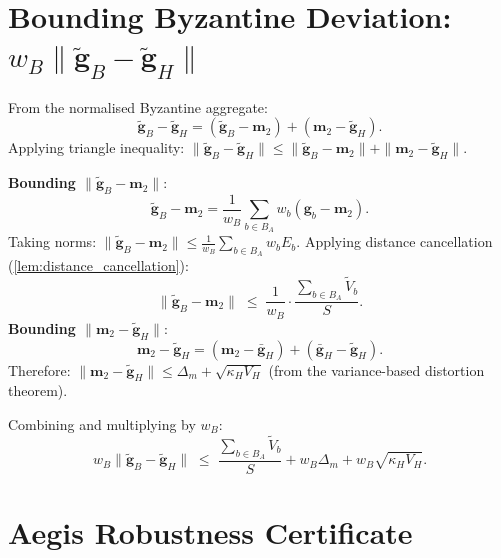 \documentclass[../main]{subfiles}
\begin{document}
\section{Bounding Byzantine Deviation: \texorpdfstring{$w_B\|\widetilde{\mathbf{g}}_B - \widetilde{\mathbf{g}}_H\|$}{w\_B ||g\_B - g\_H||}}
\label{app:byz_deviation_full}

From the normalised Byzantine aggregate:
\[
    \widetilde{\mathbf{g}}_B - \widetilde{\mathbf{g}}_H = (\widetilde{\mathbf{g}}_B - \mathbf{m}_2) + (\mathbf{m}_2 - \widetilde{\mathbf{g}}_H).
\]
Applying triangle inequality:
$\|\widetilde{\mathbf{g}}_B - \widetilde{\mathbf{g}}_H\| \leq \|\widetilde{\mathbf{g}}_B - \mathbf{m}_2\| + \|\mathbf{m}_2 - \widetilde{\mathbf{g}}_H\|$.

\textbf{Bounding $\|\widetilde{\mathbf{g}}_B - \mathbf{m}_2\|$}:
\[
    \widetilde{\mathbf{g}}_B - \mathbf{m}_2 = \frac{1}{w_B}\sum_{b \in B_A} w_b(\mathbf{g}_b - \mathbf{m}_2).
\]
Taking norms:
$\|\widetilde{\mathbf{g}}_B - \mathbf{m}_2\| \leq \frac{1}{w_B}\sum_{b \in B_A} w_b E_b$.
Applying distance cancellation (\cref{lem:distance_cancellation}):
\begin{equation}
    \|\widetilde{\mathbf{g}}_B - \mathbf{m}_2\| \;\leq\; \frac{1}{w_B}\cdot\frac{\sum_{b \in B_A} \widetilde{V}_b}{S}.
    \label{eq:byz_m2_bound}
\end{equation}
\textbf{Bounding $\|\mathbf{m}_2 - \widetilde{\mathbf{g}}_H\|$}:
\[
    \mathbf{m}_2 - \widetilde{\mathbf{g}}_H = (\mathbf{m}_2 - \bar{\mathbf{g}}_H) + (\bar{\mathbf{g}}_H - \widetilde{\mathbf{g}}_H).
\]
Therefore:
$\|\mathbf{m}_2 - \widetilde{\mathbf{g}}_H\| \leq \Delta_m + \sqrt{\kappa_H V_H}$ (from the variance-based distortion theorem).

Combining and multiplying by $w_B$:
\begin{equation}
    \boxed{w_B\|\widetilde{\mathbf{g}}_B - \widetilde{\mathbf{g}}_H\| \;\leq\;
    \frac{\sum_{b \in B_A}\widetilde{V}_b}{S} + w_B \Delta_m + w_B\sqrt{\kappa_H V_H}.}
    \label{eq:full_byz_bound}
\end{equation}
\section{Aegis Robustness Certificate}
\label{app:robustness}
\end{document}

